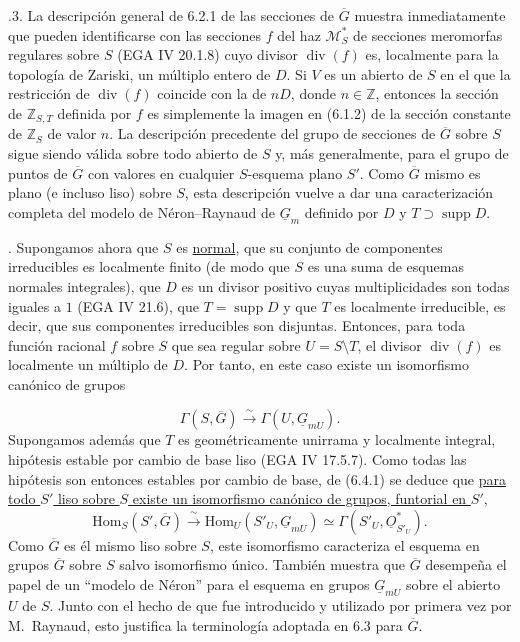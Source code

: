 \medskip
{}.3. La descripción general de 6.2.1 de las secciones de
$\overline G$ muestra inmediatamente que pueden identificarse con las
secciones $f$ del haz $\mathcal M_S^*$ de secciones meromorfas regulares
sobre $S$ (EGA IV 20.1.8) cuyo divisor $\operatorname{div}(f)$ es,
localmente para la topología de Zariski, un múltiplo entero de $D$. Si
$V$ es un abierto de $S$ en el que la restricción de
$\operatorname{div}(f)$ coincide con la de $nD$, donde
$n\in\mathbb Z$, entonces la sección de $\mathbb Z_{S,T}$ definida por
$f$ es simplemente la imagen en (6.1.2) de la sección constante de
$\mathbb Z_S$ de valor $n$. La descripción precedente del grupo de
secciones de $\overline G$ sobre $S$ sigue siendo válida sobre todo
abierto de $S$ y, más generalmente, para el grupo de puntos de
$\overline G$ con valores en cualquier $S$-esquema plano $S'$. Como
$\overline G$ mismo es plano (e incluso liso) sobre $S$, esta
descripción vuelve a dar una caracterización completa del modelo de
Néron--Raynaud de $\underline G_m$ definido por $D$ y
$T\supset\operatorname{supp}D$.

\medskip
{}. Supongamos ahora que $S$ es \underline{normal}, que su
conjunto de componentes irreducibles es localmente finito (de modo que
$S$ es una suma de esquemas normales integrales), que $D$ es un divisor
positivo cuyas multiplicidades son todas iguales a $1$ (EGA IV 21.6),
que $T=\operatorname{supp}D$ y que $T$ es localmente irreducible, es
decir, que sus componentes irreducibles son disjuntas. Entonces, para
toda función racional $f$ sobre $S$ que sea regular sobre
$U=S\setminus T$, el divisor $\operatorname{div}(f)$ es localmente un
múltiplo de $D$. Por tanto, en este caso existe un isomorfismo canónico
de grupos


\begin{equation}\tag{6.4.1}
 \Gamma(S,\overline G)\xrightarrow{\ \sim\ }
 \Gamma(U,\underline G_{mU}).
\end{equation}
Supongamos además que $T$ es geométricamente unirrama y localmente
integral, hipótesis estable por cambio de base liso (EGA IV 17.5.7).
Como todas las hipótesis son entonces estables por cambio de base, de
(6.4.1) se deduce que \underline{para todo $S'$ liso sobre $S$ existe
un isomorfismo canónico de grupos, funtorial en $S'$,}
\begin{equation}\tag{6.4.2}
 \mathrm{Hom}_S(S',\overline G)\xrightarrow{\ \sim\ }
 \mathrm{Hom}_U(S'_U,\underline G_{mU})
 \simeq\Gamma(S'_U,\underline O_{S'_U}^*).
\end{equation}
Como $\overline G$ es él mismo liso sobre $S$, este isomorfismo
caracteriza el esquema en grupos $\overline G$ sobre $S$ salvo
isomorfismo único. También muestra que $\overline G$ desempeña el papel
de un ``modelo de Néron'' para el esquema en grupos
$\underline G_{mU}$ sobre el abierto $U$ de $S$. Junto con el hecho de
que fue introducido y utilizado por primera vez por M.~Raynaud, esto
justifica la terminología adoptada en 6.3 para $\overline G$.

